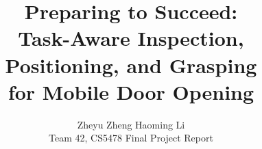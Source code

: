 \title{Preparing to Succeed:\\
Task-Aware Inspection, Positioning, and Grasping\\
for Mobile Door Opening}
\author{Zheyu Zheng \qquad Haoming Li\\
  Team 42, CS5478 Final Project Report}
